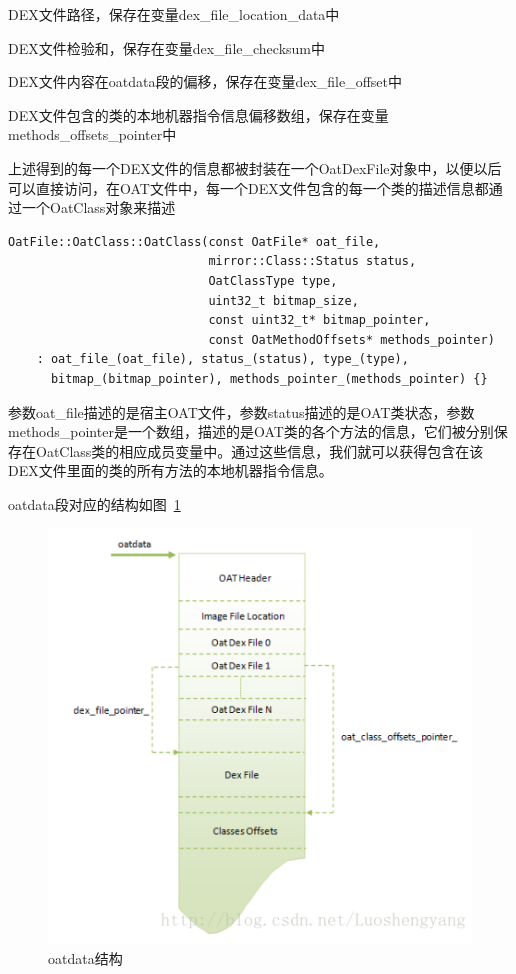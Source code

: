 DEX文件路径，保存在变量dex\_file\_location\_data中

DEX文件检验和，保存在变量dex\_file\_checksum中

DEX文件内容在oatdata段的偏移，保存在变量dex\_file\_offset中

DEX文件包含的类的本地机器指令信息偏移数组，保存在变量methods\_offsets\_pointer中

上述得到的每一个DEX文件的信息都被封装在一个OatDexFile对象中，以便以后可以直接访问，在OAT文件中，每一个DEX文件包含的每一个类的描述信息都通过一个OatClass对象来描述
\begin{lstlisting}
OatFile::OatClass::OatClass(const OatFile* oat_file,
                            mirror::Class::Status status,
                            OatClassType type,
                            uint32_t bitmap_size,
                            const uint32_t* bitmap_pointer,
                            const OatMethodOffsets* methods_pointer)
    : oat_file_(oat_file), status_(status), type_(type),
      bitmap_(bitmap_pointer), methods_pointer_(methods_pointer) {}
\end{lstlisting}
参数oat\_file描述的是宿主OAT文件，参数status描述的是OAT类状态，参数methods\_pointer是一个数组，描述的是OAT类的各个方法的信息，它们被分别保存在OatClass类的相应成员变量中。通过这些信息，我们就可以获得包含在该DEX文件里面的类的所有方法的本地机器指令信息。

oatdata段对应的结构如图~\ref{fig:oatdata}
\begin{figure}[hbpt]
\centering
\includegraphics[width=\textwidth]{img/oatdata.png}
\caption{oatdata结构}
\label{fig:oatdata}
\end{figure}

